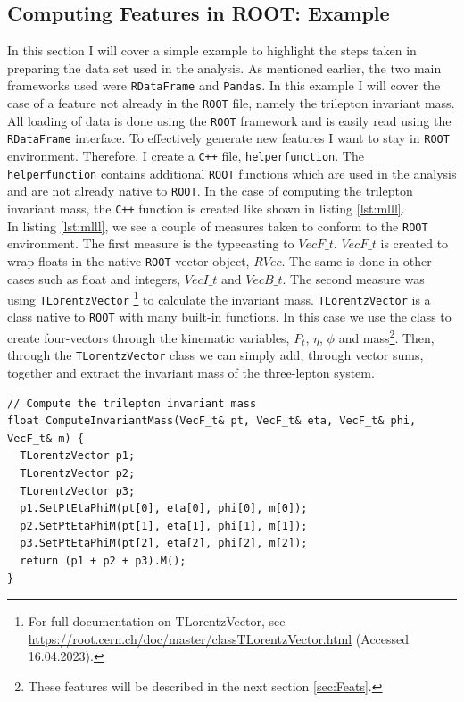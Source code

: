 \subsection{Computing Features in ROOT: Example}
In this section I will cover a simple example to highlight the steps taken in preparing the data set 
used in the analysis. As mentioned earlier, the two main frameworks used were \verb!RDataFrame! and \verb!Pandas!. 
In this example I will cover the case of a feature not already in the \verb!ROOT! file, namely the trilepton
invariant mass. All loading of data is done using the \verb!ROOT! framework and is easily read using the
\verb!RDataFrame! interface. To effectively generate new features I want to stay in \verb!ROOT! environment. Therefore,
I create a \verb!C++! file, \texttt{helperfunction}. The \texttt{helperfunction} contains additional 
\verb!ROOT! functions which are used in the analysis and are not already native to \verb!ROOT!. In the case 
of computing the trilepton invariant mass, the \verb!C++! function is created like shown in listing 
\ref{lst:mlll}.
\\
In listing \ref{lst:mlll}, we see a couple of measures taken to conform to the \verb!ROOT! environment. The first measure is 
the typecasting to $VecF\_t$. $VecF\_t$ is created to wrap floats in the native \verb!ROOT! vector object, $RVec$. 
The same is done in other cases such as float and integers, $VecI\_t$ and $VecB\_t$. The second measure
was using \verb!TLorentzVector! \footnote{For full documentation on TLorentzVector, see \url{https://root.cern.ch/doc/master/classTLorentzVector.html} (Accessed 16.04.2023).} 
to calculate the invariant mass. \verb!TLorentzVector! is a class native to \verb!ROOT! with many built-in functions. In 
this case we use the class to create four-vectors through the kinematic variables, $P_t$, $\eta$, $\phi$ and mass\footnote{These features
will be described in the next section \ref{sec:Feats}.}. Then, through the \verb!TLorentzVector! class we can simply add, through vector sums, 
together and extract the invariant mass of the three-lepton system. 
\lstset{style=Cpp}
\begin{lstlisting}[caption={$C{++}$-function which implementes the calculation of the trilepton invariant mass.},captionpos=b, label={lst:mlll}]
// Compute the trilepton invariant mass 
float ComputeInvariantMass(VecF_t& pt, VecF_t& eta, VecF_t& phi, VecF_t& m) {
  TLorentzVector p1;
  TLorentzVector p2;
  TLorentzVector p3;
  p1.SetPtEtaPhiM(pt[0], eta[0], phi[0], m[0]);
  p2.SetPtEtaPhiM(pt[1], eta[1], phi[1], m[1]);
  p3.SetPtEtaPhiM(pt[2], eta[2], phi[2], m[2]);
  return (p1 + p2 + p3).M();
}
\end{lstlisting}
